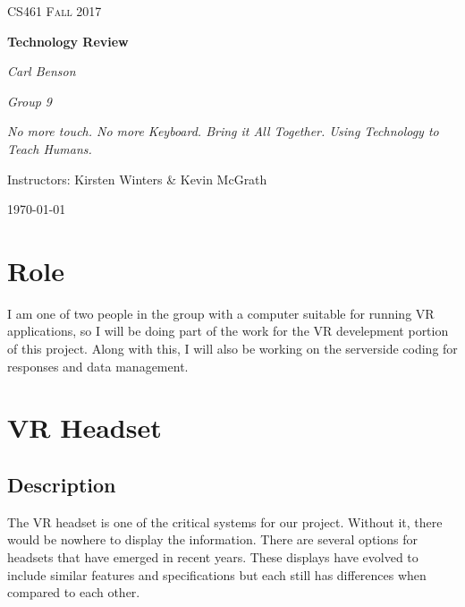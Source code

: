 \documentclass[letterpaper,10pt,onecolumn]{IEEEtran}
\begin{document}
\sloppy

\begin{titlepage}
	\centering
	{\scshape\Large CS461 Fall 2017\par}
	\vspace{1.5cm}
	{\huge\bfseries Technology Review\par}
  \vspace{2cm}

	{\Large\itshape Carl Benson\par}
  {\Large\itshape Group 9\par}
  {\Large\itshape No more touch. No more Keyboard. Bring it All Together. Using Technology to Teach Humans.\par}
	Instructors: Kirsten Winters \& Kevin McGrath\par
  {\large \today\par}
  \begin{abstract}
  Technology is increasing at an amazing rate, and with it comes many opportunities. Headmounted displays can completely immerse a user in a virtual world. Computers can share the contents of nearly all human knowledge in the blink of an eye. They can even identify and react to occurences in ways similar to that of humans. This paper will cover thre options each for virtual reality headsets, data hosting, and machine learning frameworks as well as compare and contrast them.
  \end{abstract}

\end{titlepage}

\clearpage
\tableofcontents

\section{Role}
    I am one of two people in the group with a computer suitable for running VR applications, so I will be doing part of the work for the VR develepment portion of this project. Along with this, I will also be working on the serverside coding for responses and data management. 

\section{VR Headset}
  \subsection {Description} The VR headset is one of the critical systems for our project. Without it, there would be nowhere to display the information. There are several options for headsets that have emerged in recent years. These displays have evolved to include similar features and specifications but each still has differences when compared to each other.
\end{document}
